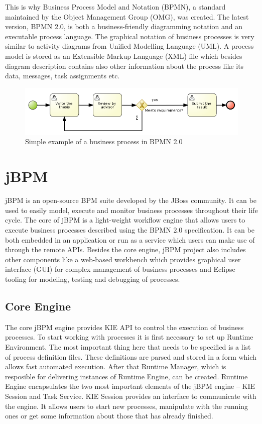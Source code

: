 \documentclass[12pt,oneside,final]{fithesis2}
\begin{document}
This is why Business Process Model and Notation (BPMN), a standard maintained by the Object Management Group (OMG), was created.
The latest version, BPMN 2.0, is both a business-friendly diagramming notation and an executable process language. \cite{silver11}
The graphical notation of business processes is very similar to activity diagrams from Unified Modelling Language (UML).
A process model is stored as an Extensible Markup Language (XML) file which besides diagram description contains also other information about the process like its data, messages, task assignments etc.

\begin{figure}[ht!]
\centering
\includegraphics[width=\textwidth]{images/process-example.png}
\caption{Simple example of a business process in BPMN 2.0}
\label{fig:process-example}
\end{figure}

\section{jBPM}
jBPM is an open-source BPM suite developed by the JBoss community.
It can be used to easily model, execute and monitor business processes throughout their life cycle.
The core of jBPM is a light-weight workflow engine that allows users to execute business processes described using the BPMN 2.0 specification.
It can be both embedded in an application or run as a service which users can make use of through the remote APIs.
Besides the core engine, jBPM project also includes other components like a web-based workbench which provides graphical user interface (GUI) for complex management of business processes and Eclipse\footnotemark{} tooling for modeling, testing and debugging of processes.
\cite{jbpm6overview}

\subsection{Core Engine}
The core jBPM engine provides KIE\footnotemark{} API \cite{jbpm6api} to control the execution of business processes.
To start working with processes it is first necessary to set up Runtime Environment.
The most important thing here that needs to be specified is a list of process definition files.
These definitions are parsed and stored in a form which allows fast automated execution.
After that Runtime Manager, which is resposible for delivering instances of Runtime Engine, can be created.
Runtime Engine encapsulates the two most important elements of the jBPM engine -- KIE Session and Task Service.
KIE Session provides an interface to communicate with the engine.
It allows users to start new processes, manipulate with the running ones or get some information about those that has already finished.
\cite{jbpm6engine}
\end{document}
